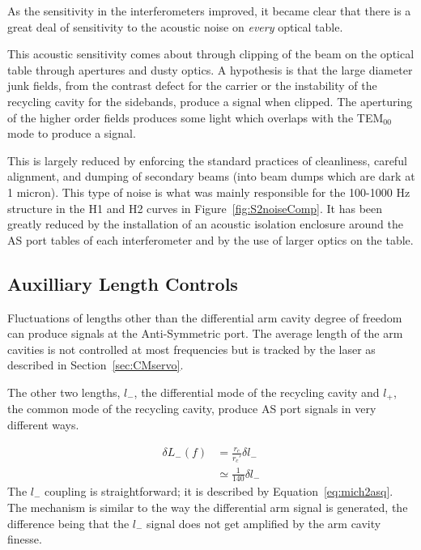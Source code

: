 As the sensitivity in the interferometers improved, it became clear that there
is a great deal of sensitivity to the acoustic noise on \emph{every} optical table.

This acoustic sensitivity comes about through clipping of the beam on the
optical table through apertures and dusty optics. A hypothesis is that
the large diameter junk fields, from the contrast defect for the carrier or
the instability of the recycling cavity for the sidebands, produce
a signal when clipped. The aperturing of the higher order fields produces
some light which overlaps with the TEM$_{00}$ mode to produce a signal. 

This is largely reduced by enforcing the standard practices
of cleanliness, careful alignment, and dumping of secondary beams (into beam
dumps which are dark at 1 micron). This type of noise is what was
mainly responsible for the 100-1000 Hz structure in the H1 and H2 curves in
Figure~\ref{fig:S2noiseComp}. It has been greatly reduced by the installation
of an acoustic isolation enclosure around the AS port tables
of each interferometer and by the use of larger optics on the table.



\subsection{Auxilliary Length Controls}
\label{sec:POBnoise}

Fluctuations of lengths other than the differential arm cavity
degree of freedom can produce signals at the Anti-Symmetric port. The average
length of the arm cavities is not controlled at most frequencies
but is tracked by the laser as described in Section~\ref{sec:CMservo}.

The other two lengths, $l_{-}$, the differential mode of the recycling
cavity and $l_{+}$, the common mode of the recycling cavity, produce
AS port signals in very different ways.

\begin{equation}
 \begin{split}
  \delta L_{-}(f) &= \frac{r_{c}}{r_{c}'} \delta l_- \\
                  &\simeq \frac{1}{140} \delta l_-
 \end{split}
 \label{eq:mich2darm}
\end{equation}
The $l_{-}$ coupling is straightforward; it is described by
Equation~\ref{eq:mich2asq}. The mechanism is similar to the way 
the differential arm signal is generated, the difference being that 
the $l_{-}$ signal does not get amplified by the arm cavity finesse.

